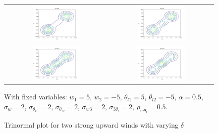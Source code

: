 \begin{figure}[!htb]
    \centering
    \begin{tabular}{cc}
        \multicolumn{1}{c}{\includegraphics[width=0.48\textwidth]{include/figures/plot3_1}} &
        \multicolumn{1}{c}{\includegraphics[width=0.48\textwidth]{include/figures/plot3_2}} \\
        \multicolumn{1}{c}{\includegraphics[width=0.48\textwidth]{include/figures/plot3_3}} &
        \multicolumn{1}{c}{\includegraphics[width=0.48\textwidth]{include/figures/plot3_4}} \\
    \end{tabular}
    \caption{Trinormal plot for two strong upward winds with varying $\delta$}
    \label{fig:plot3}
    With fixed variables: $w_1 = 5$, $w_2 = -5$, $\theta_{l1} = 5$, $\theta_{l2} = -5$,
    $\alpha = 0.5$, $\sigma_w = 2$, $\sigma_{\theta_{l1}} = 2$,  $\sigma_{\theta_{l2}} = 2$,
    $\sigma_{w3} = 2$, $\sigma_{3\theta_l} = 2$, $\rho_{w\theta_l} = 0.5$.
\end{figure}

